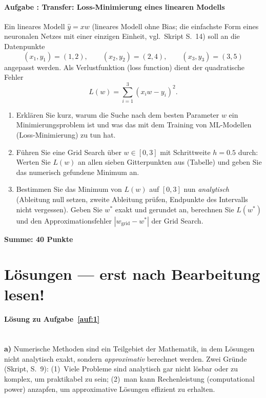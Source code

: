 \documentclass[11pt,a4paper]{scrartcl}
\newcounter{aufgabe}
\newcommand{\aufgabe}[2]{%
  \refstepcounter{aufgabe}%
  \paragraph{Aufgabe \theaufgabe: #1 \normalfont\mdseries[#2]}}
\begin{document}
\schreibraum[8]
\aufgabe{Transfer: Loss-Minimierung eines linearen Modells}{6 Punkte}\label{auf:8}
Ein lineares Modell $\hat{y} = xw$ (lineares Modell ohne Bias; die einfachste Form eines
neuronalen Netzes mit einer einzigen Einheit, vgl.\ Skript S.~14) soll an die Datenpunkte
\[
(x_1, y_1) = (1, 2), \qquad (x_2, y_2) = (2, 4), \qquad (x_3, y_3) = (3, 5)
\]
angepasst werden. Als Verlustfunktion (loss function) dient der quadratische Fehler
\[
L(w) = \sum_{i=1}^{3} (x_i w - y_i)^2 .
\]
\begin{enumerate}[label=\alph*),itemsep=2pt]
  \item Erklären Sie kurz, warum die Suche nach dem besten Parameter $w$ ein
        Minimierungsproblem ist und was das mit dem Training von ML-Modellen
        (Loss-Minimierung) zu tun hat.
  \item Führen Sie eine Grid Search über $w \in [0, 3]$ mit Schrittweite $h = 0.5$ durch:
        Werten Sie $L(w)$ an allen sieben Gitterpunkten aus (Tabelle) und geben Sie das
        numerisch gefundene Minimum an.
  \item Bestimmen Sie das Minimum von $L(w)$ auf $[0,3]$ nun \emph{analytisch}
        (Ableitung null setzen, zweite Ableitung prüfen, Endpunkte des Intervalls nicht
        vergessen). Geben Sie $w^\ast$ exakt und gerundet an, berechnen Sie $L(w^\ast)$
        und den Approximationsfehler $|w_{\text{grid}} - w^\ast|$ der Grid Search.
\end{enumerate}

\bigskip
\noindent\textbf{Summe: 40 Punkte}

\schreibraum[9]
\newpage
\section*{Lösungen --- erst nach Bearbeitung lesen!}

\paragraph{Lösung zu Aufgabe~\ref{auf:1}}\mbox{}\\[2pt]
\textbf{a)} Numerische Methoden sind ein Teilgebiet der Mathematik, in dem Lösungen nicht
analytisch exakt, sondern \emph{approximativ} berechnet werden. Zwei Gründe (Skript, S.~9):
(1)~Viele Probleme sind analytisch gar nicht lösbar oder zu komplex, um praktikabel zu sein;
(2)~man kann Rechenleistung (computational power) anzapfen, um approximative Lösungen
effizient zu erhalten.
\end{document}
